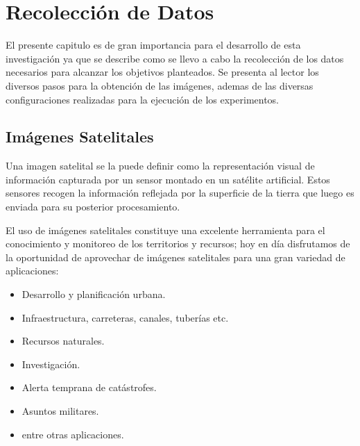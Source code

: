 \chapter{Recolección de Datos}\label{chap:recoleccion}

El presente capitulo es de gran importancia para el desarrollo de esta investigación ya que se describe como se llevo a cabo la recolección de los datos necesarios para alcanzar los objetivos planteados. Se presenta al lector los diversos pasos para la obtención de las imágenes, ademas de las diversas configuraciones realizadas para la ejecución de los experimentos.

\section{Imágenes Satelitales}\label{sec:imagen_satelitales}

Una imagen satelital se la puede definir como la representación visual de información capturada por un sensor montado en un satélite artificial. Estos sensores recogen la información reflejada por la superficie de la tierra que luego es enviada para su posterior procesamiento.

El uso de imágenes satelitales constituye una excelente herramienta para el conocimiento y monitoreo de los territorios y recursos; hoy en día disfrutamos de la oportunidad de aprovechar de imágenes satelitales para una gran variedad de aplicaciones:
\begin{itemize}
	\item Desarrollo y planificación urbana.
	\item Infraestructura, carreteras, canales, tuberías etc.
	\item Recursos naturales.
	\item Investigación.
	\item Alerta temprana de catástrofes.
	\item Asuntos militares.
	\item entre otras aplicaciones.
\end{itemize}

